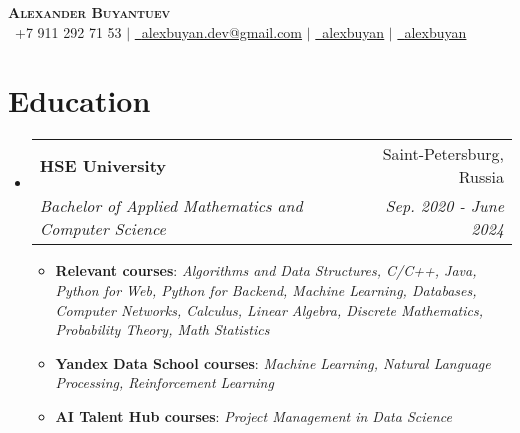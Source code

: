 \documentclass[english,russian,letterpaper,11pt]{article}
\makeatletter
\newcommand{\resumeItem}[1]{
  \item\small{
    {#1 \vspace{-2pt}}
  }
}
\newcommand{\resumeSubheading}[4]{
  \vspace{-2pt}\item
    \begin{tabular*}{0.97\textwidth}[t]{l@{\extracolsep{\fill}}r}
      \textbf{#1} & #2 \\
      \textit{\small#3} & \textit{\small #4} \\
    \end{tabular*}\vspace{-7pt}
}
\newcommand{\resumeSubHeadingListStart}{\begin{itemize}[leftmargin=0.15in, label={}]}
\newcommand{\resumeSubHeadingListEnd}{\end{itemize}}
\newcommand{\resumeItemListStart}{\begin{itemize}}
\newcommand{\resumeItemListEnd}{\end{itemize}\vspace{-5pt}}
\makeatother
\begin{document}

\begin{center}
    \textbf{\Huge \scshape Alexander Buyantuev} \\ \vspace{2pt}
    \small \faPhone \ +7 911 292 71 53 $|$ \href{mailto:alexbuyan.dev@gmail.com}{\faEnvelope \ \underline{alexbuyan.dev@gmail.com}} $|$ 
    \href{https://github.com/alexbuyan}{\faGithub \ \underline{alexbuyan}} $|$ \href{https://www.linkedin.com/in/alexander-buyantuev-063785223}{\faLinkedin \ \underline{alexbuyan}}
\end{center}


\section{Education}
  \resumeSubHeadingListStart
    \resumeSubheading
      {HSE University}{Saint-Petersburg, Russia}
      {Bachelor of Applied Mathematics and Computer Science}{Sep. 2020 - June 2024}
      \resumeItemListStart
        \resumeItem{\textbf{Relevant courses}: \textit{Algorithms and Data Structures, C/C++, Java, Python for Web, Python for Backend, Machine Learning, Databases, Computer Networks, Calculus, Linear Algebra, Discrete Mathematics, Probability Theory, Math Statistics}}
        \resumeItem{\textbf{Yandex Data School courses}: \textit{Machine Learning, Natural Language Processing, Reinforcement Learning}}
        \resumeItem{\textbf{AI Talent Hub courses}: \textit{Project Management in Data Science}}
      \resumeItemListEnd
  \resumeSubHeadingListEnd

\end{document}
